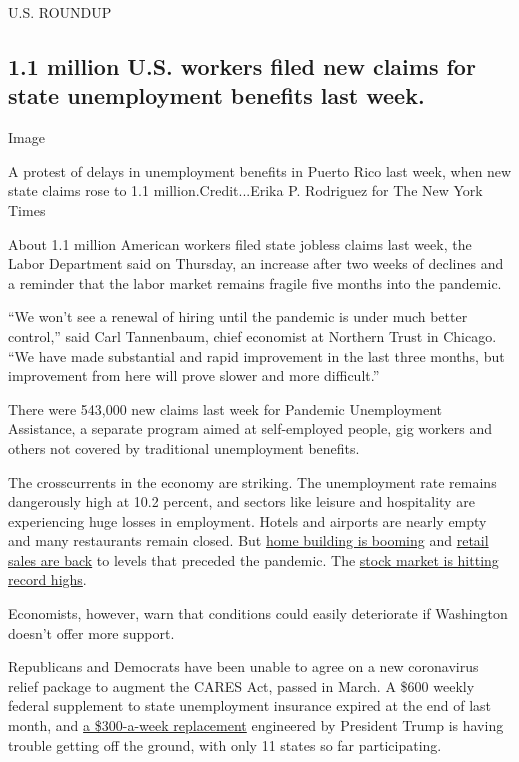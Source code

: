 U.S. ROUNDUP

\hypertarget{11-million-us-workers-filed-new-claims-for-state-unemployment-benefits-last-week}{%
\subsection{1.1 million U.S. workers filed new claims for state
unemployment benefits last
week.}\label{11-million-us-workers-filed-new-claims-for-state-unemployment-benefits-last-week}}

Image

A protest of delays in unemployment benefits in Puerto Rico last week,
when new state claims rose to 1.1 million.Credit...Erika P. Rodriguez
for The New York Times

About 1.1 million American workers filed state jobless claims last week,
the Labor Department said on Thursday, an increase after two weeks of
declines and a reminder that the labor market remains fragile five
months into the pandemic.

``We won't see a renewal of hiring until the pandemic is under much
better control,'' said Carl Tannenbaum, chief economist at Northern
Trust in Chicago. ``We have made substantial and rapid improvement in
the last three months, but improvement from here will prove slower and
more difficult.''

There were 543,000 new claims last week for Pandemic Unemployment
Assistance, a separate program aimed at self-employed people, gig
workers and others not covered by traditional unemployment benefits.

The crosscurrents in the economy are striking. The unemployment rate
remains dangerously high at 10.2 percent, and sectors like leisure and
hospitality are experiencing huge losses in employment. Hotels and
airports are nearly empty and many restaurants remain closed. But
\href{https://www.reuters.com/article/us-usa-economy-housingstarts/us-housing-starts-surge-in-july-in-rare-pandemic-bright-spot-idUSKCN25E21O}{home
building is booming} and
\href{https://www.nytimes3xbfgragh.onion/2020/08/14/business/retail-sales-coronavirus.html}{retail
sales are back} to levels that preceded the pandemic. The
\href{https://www.nytimes3xbfgragh.onion/2020/08/18/business/stock-market-record.html}{stock
market is hitting record highs}.

Economists, however, warn that conditions could easily deteriorate if
Washington doesn't offer more support.

Republicans and Democrats have been unable to agree on a new coronavirus
relief package to augment the CARES Act, passed in March. A \$600 weekly
federal supplement to state unemployment insurance expired at the end of
last month, and
\href{https://www.nytimes3xbfgragh.onion/2020/08/13/business/economy/unemployment-benefits-coronavirus.html}{a
\$300-a-week replacement} engineered by President Trump is having
trouble getting off the ground, with only 11 states so far
participating.

